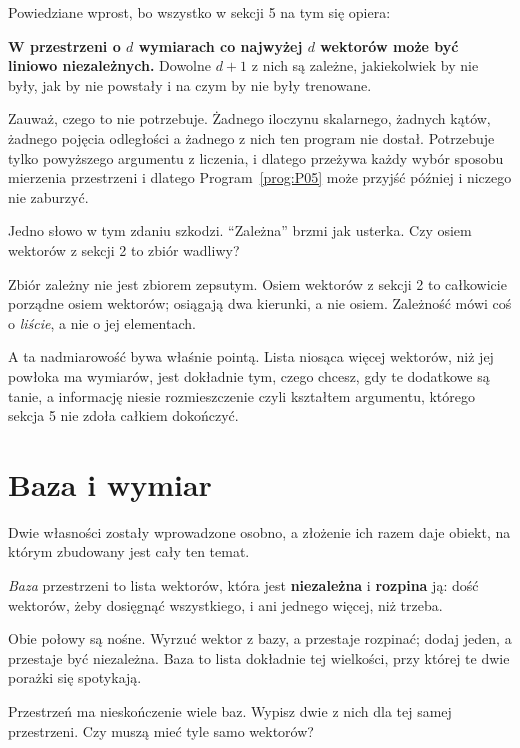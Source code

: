 \begin{fr}

Powiedziane wprost, bo wszystko w sekcji 5 na tym się opiera:

\medskip
\noindent
\textbf{W przestrzeni o $d$ wymiarach co najwyżej $d$ wektorów może być liniowo
niezależnych.} Dowolne $d + 1$ z nich są zależne, jakiekolwiek by nie były, jak
by nie powstały i na czym by nie były trenowane.

Zauważ, czego to nie potrzebuje. Żadnego iloczynu skalarnego, żadnych kątów,
żadnego pojęcia odległości \dash{} a żadnego z nich ten program nie dostał.
Potrzebuje tylko powyższego argumentu z liczenia, i dlatego przeżywa każdy
wybór sposobu mierzenia przestrzeni i dlatego Program~\ref{prog:P05} może
przyjść później i niczego nie zaburzyć.

Jedno słowo w tym zdaniu szkodzi. \enquote{Zależna} brzmi jak usterka. Czy
osiem wektorów z sekcji 2 to zbiór wadliwy?
\nextframe
\end{fr}

\begin{fr}
Zbiór zależny nie jest zbiorem zepsutym. Osiem wektorów z sekcji 2 to
całkowicie porządne osiem wektorów; osiągają dwa kierunki, a nie
osiem. Zależność mówi coś o \emph{liście}, a nie o jej elementach.

A ta nadmiarowość bywa właśnie pointą. Lista niosąca więcej wektorów, niż jej
powłoka ma wymiarów, jest dokładnie tym, czego chcesz, gdy te dodatkowe są
tanie, a informację niesie rozmieszczenie \dash{} czyli kształtem argumentu,
którego sekcja 5 nie zdoła całkiem dokończyć.
\end{fr}

\section{Baza i wymiar}
\label{sec:P04-basis}

\begin{fr}
Dwie własności zostały wprowadzone osobno, a złożenie ich razem daje obiekt, na
którym zbudowany jest cały ten temat.

\emph{Baza} przestrzeni to lista wektorów, która jest \textbf{niezależna} i
\textbf{rozpina} ją: dość wektorów, żeby dosięgnąć wszystkiego, i ani jednego
więcej, niż trzeba.

Obie połowy są nośne. Wyrzuć wektor z bazy, a przestaje rozpinać; dodaj jeden,
a przestaje być niezależna. Baza to lista dokładnie tej wielkości, przy której
te dwie porażki się spotykają.

Przestrzeń ma nieskończenie wiele baz. Wypisz dwie z nich dla tej samej
przestrzeni. Czy muszą mieć tyle samo wektorów?
\nextframe
\end{fr}

